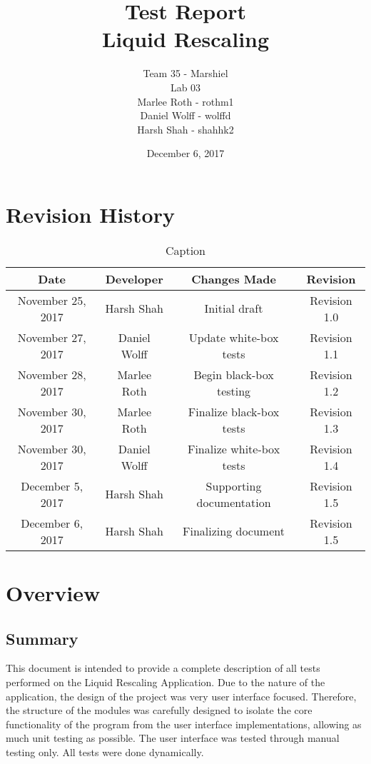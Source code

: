 \documentclass{article}
\title{\bf{Test Report}\\
\bf{Liquid Rescaling}}
\author{Team 35 - Marshiel \\
Lab 03\\
Marlee Roth - rothm1 \\
Daniel Wolff - wolffd \\
Harsh Shah - shahhk2}
\date{December 6, 2017}
\begin{document}
\maketitle
\newpage

\tableofcontents
\newpage

\listoffigures
\listoftables

\newpage

\section{Revision History}
\begin{table}[h!]
    \centering
    \begin{tabular}{|c|c|c|c|}
        \hline
        Date & Developer & Changes Made & Revision \\
        \hline
        November 25, 2017 & Harsh Shah & Initial draft & Revision 1.0 \\
        \hline
        November 27, 2017 & Daniel Wolff & Update white-box tests & Revision 1.1 \\
        \hline
        November 28, 2017 & Marlee Roth & Begin black-box testing & Revision 1.2 \\
        \hline
        November 30, 2017 & Marlee Roth & Finalize black-box tests & Revision 1.3 \\
        \hline
        November 30, 2017 & Daniel Wolff & Finalize white-box tests & Revision 1.4 \\
        \hline
        December 5, 2017 & Harsh Shah & Supporting documentation & Revision 1.5 \\
        \hline
        December 6, 2017 & Harsh Shah & Finalizing document & Revision 1.5 \\
        \hline
    \end{tabular}
    \caption{Caption}
    \label{tab:my_label}
\end{table}

\section{Overview}

\subsection{Summary}
This document is intended to provide a complete description of all tests performed on the Liquid Rescaling Application. Due to the nature of the application, the design of the project was very user interface focused. Therefore, the structure of the modules was carefully designed to isolate the core functionality of the program from the user interface implementations, allowing as much unit testing as possible. The user interface was tested through manual testing only. All tests were done dynamically.
\end{document}
